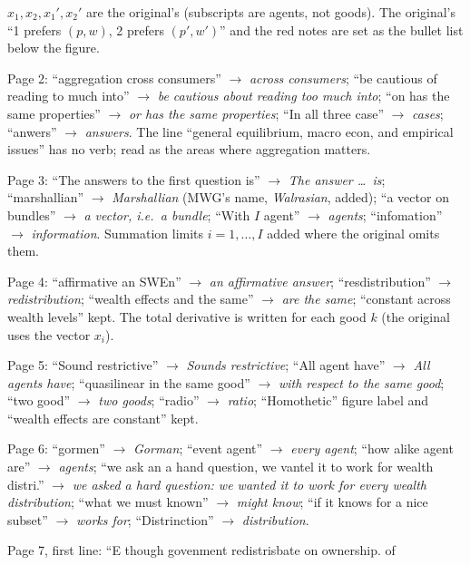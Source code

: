 \documentclass[11pt]{article}
\begin{document}
\begin{transcriptnotes}
        $x_1,x_2,x_1',x_2'$ are the original's (subscripts are agents, not
        goods). The original's ``1 prefers $(p,w)$, 2 prefers $(p',w')$'' and the
        red notes are set as the bullet list below the figure.
  \item Page 2: ``aggregation cross consumers'' $\to$ \emph{across consumers};
        ``be cautious of reading to much into'' $\to$ \emph{be cautious about
        reading too much into}; ``on has the same properties'' $\to$ \emph{or has
        the same properties}; ``In all three case'' $\to$ \emph{cases}; ``anwers''
        $\to$ \emph{answers}. The line ``general equilibrium, macro econ, and
        empirical issues'' has no verb; read as the areas where aggregation
        matters.
  \item Page 3: ``The answers to the first question is'' $\to$ \emph{The answer
        \dots\ is}; ``marshallian'' $\to$ \emph{Marshallian} (MWG's name,
        \emph{Walrasian}, added); ``a vector on bundles'' $\to$ \emph{a vector,
        i.e.\ a bundle}; ``With $I$ agent'' $\to$ \emph{agents};
        ``infomation'' $\to$ \emph{information}. Summation limits $i=1,\dots,I$
        added where the original omits them.
  \item Page 4: ``affirmative an SWEn'' $\to$ \emph{an affirmative answer};
        ``resdistribution'' $\to$ \emph{redistribution}; ``wealth effects and the
        same'' $\to$ \emph{are the same}; ``constant across wealth levels''
        kept. The total derivative is written for each good $k$ (the original
        uses the vector $x_i$).
  \item Page 5: ``Sound restrictive'' $\to$ \emph{Sounds restrictive}; ``All
        agent have'' $\to$ \emph{All agents have}; ``quasilinear in the same
        good'' $\to$ \emph{with respect to the same good}; ``two good'' $\to$
        \emph{two goods}; ``radio'' $\to$ \emph{ratio}; ``Homothetic''
        figure label and ``wealth effects are constant'' kept.
  \item Page 6: ``gormen'' $\to$ \emph{Gorman}; ``event agent'' $\to$
        \emph{every agent}; ``how alike agent are'' $\to$ \emph{agents};
        ``we ask an a hand question, we vantel it to work for wealth distri.''
        $\to$ \emph{we asked a hard question: we wanted it to work for every
        wealth distribution}; ``what we must known'' $\to$ \emph{might know};
        ``if it knows for a nice subset'' $\to$ \emph{works for};
        ``Distrinction'' $\to$ \emph{distribution}.
  \item Page 7, first line: ``E though govenment redistrisbate on ownership. of

\end{transcriptnotes}
\end{document}
